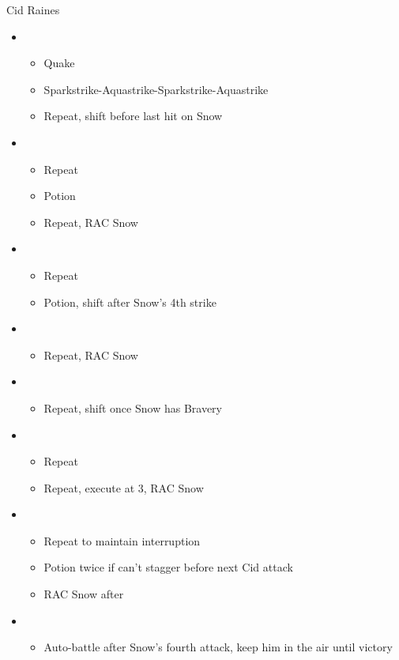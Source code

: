 	\begin{battle}[1:43]{Cid Raines}
		\begin{itemize}
			\item \first
			      \begin{itemize}
				      \item Quake
				      \item Sparkstrike-Aquastrike-Sparkstrike-Aquastrike
				      \item Repeat, shift before last hit on Snow
			      \end{itemize}
			\item \second
			      \begin{itemize}
				      \item Repeat
				      \item Potion
				      \item Repeat, RAC Snow
			      \end{itemize}
			\item \third
			      \begin{itemize}
				      \item Repeat
				      \item Potion, shift after Snow's 4th strike
			      \end{itemize}
			\item \second
			      \begin{itemize}
				      \item Repeat, RAC Snow
			      \end{itemize}
			\item \third
			      \begin{itemize}
				      \item Repeat, shift once Snow has Bravery
			      \end{itemize}
			\item \second
			      \begin{itemize}
				      \item Repeat
				      \item Repeat, execute at 3, RAC Snow
			      \end{itemize}
			\item \fourth
			      \begin{itemize}
				      \item Repeat to maintain interruption
				      \item Potion twice if can't stagger before next Cid attack
				      \item RAC Snow after \stagger
			      \end{itemize}
			\item \sixth
			      \begin{itemize}
				      \item Auto-battle after Snow's fourth attack, keep him in the air until victory
			      \end{itemize}
		\end{itemize}
	\end{battle}
